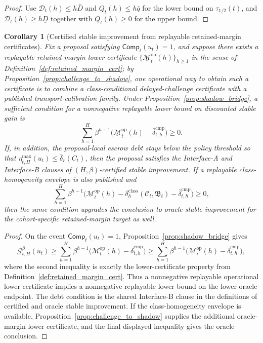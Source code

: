 \documentclass[11pt]{article}
\newtheorem{corollary}[theorem]{Corollary}
\theoremstyle{definition}
\newcommand{\1}{\mathbf{1}}
\begin{document}
\begin{proof}
Use $\mathcal D_t(h)\le h\bar D$ and $Q_t(h)\le h\bar q$ for the lower bound on $\tau_{1/2}(t)$, and $\mathcal D_t(h)\ge h\underline D$ together with $Q_t(h)\ge 0$ for the upper bound.
\end{proof}

\begin{corollary}[Certified stable improvement from replayable retained-margin certificates]\label{cor:shadow_cert}
Fix a proposal satisfying $\mathsf{Comp}_t(u_t)=1$, and suppose there exists a replayable retained-margin lower certificate $\{\underline{\mathcal M}_t^{\mathrm{op}}(h)\}_{h\ge 1}$ in the sense of Definition~\ref{def:retained_margin_cert}; by Proposition~\ref{prop:challenge_to_shadow}, one operational way to obtain such a certificate is to combine a class-conditional delayed-challenge certificate with a published transport-calibration family. Under Proposition~\ref{prop:shadow_bridge}, a sufficient condition for a nonnegative replayable lower bound on discounted stable gain is
\[
\sum_{h=1}^{H}\beta^{h-1}\bigl(\underline{\mathcal M}_t^{\mathrm{op}}(h)-\bar\delta_{t,h}^{\mathrm{cmp}}\bigr)\ge 0.
\]
If, in addition, the proposal-local escrow debt stays below the policy threshold so that $\eta_{t,H}^{\max}(u_t)\le \bar\delta_r(C_t)$, then the proposal satisfies the Interface-A and Interface-B clauses of $(H,\beta)$-certified stable improvement. If a replayable class-homogeneity envelope is also published and
\[
\sum_{h=1}^{H}\beta^{h-1}\bigl(\underline{\mathcal M}_t^{\mathrm{op}}(h)-\delta_h^{\mathrm{class}}(\mathcal C_t,\mathfrak B_t)-\bar\delta_{t,h}^{\mathrm{cmp}}\bigr)\ge 0,
\]
then the same condition upgrades the conclusion to oracle stable improvement for the cohort-specific retained-margin target as well.
\end{corollary}

\begin{proof}
On the event $\mathsf{Comp}_t(u_t)=1$, Proposition~\ref{prop:shadow_bridge} gives
\[
\mathcal G_{t,H}^{\beta}(u_t)
\ge
\sum_{h=1}^{H}\beta^{h-1}\bigl(\mathcal M_t^{\mathrm{op}}(h)-\bar\delta_{t,h}^{\mathrm{cmp}}\bigr)
\ge
\sum_{h=1}^{H}\beta^{h-1}\bigl(\underline{\mathcal M}_t^{\mathrm{op}}(h)-\bar\delta_{t,h}^{\mathrm{cmp}}\bigr),
\]
where the second inequality is exactly the lower-certificate property from Definition~\ref{def:retained_margin_cert}. Thus a nonnegative replayable operational lower certificate implies a nonnegative replayable lower bound on the lower oracle endpoint. The debt condition is the shared Interface-B clause in the definitions of certified and oracle stable improvement. If the class-homogeneity envelope is available, Proposition~\ref{prop:challenge_to_shadow} supplies the additional oracle-margin lower certificate, and the final displayed inequality gives the oracle conclusion.
\end{proof}
\end{document}
